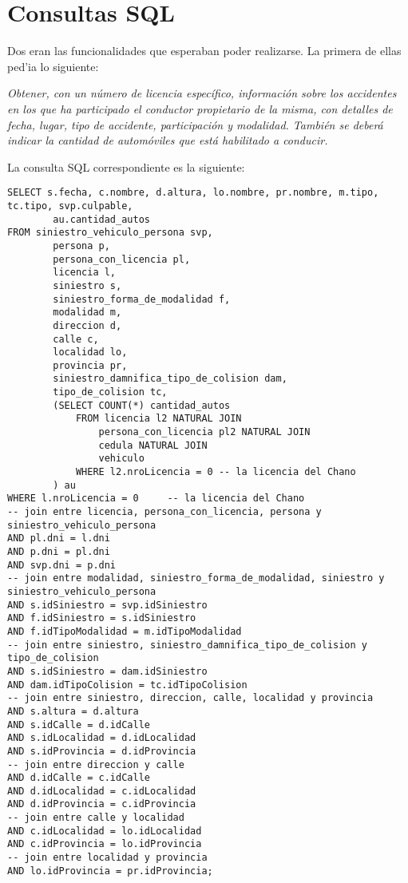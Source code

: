 \section{Consultas SQL}

Dos eran las funcionalidades que esperaban poder realizarse. La primera de ellas ped'ia lo siguiente:

\textit{Obtener, con un número de licencia específico,
información sobre los accidentes en los que ha participado el conductor propietario de
la misma, con detalles de fecha, lugar, tipo de accidente, participación y modalidad.
También se deberá indicar la cantidad de automóviles que está habilitado a conducir.}

La consulta SQL correspondiente es la siguiente:

\begin{verbatim}
SELECT s.fecha, c.nombre, d.altura, lo.nombre, pr.nombre, m.tipo, tc.tipo, svp.culpable, 
        au.cantidad_autos
FROM siniestro_vehiculo_persona svp, 
        persona p, 
        persona_con_licencia pl, 
        licencia l, 
        siniestro s,
        siniestro_forma_de_modalidad f,
        modalidad m,
        direccion d,
        calle c,
        localidad lo, 
        provincia pr,
        siniestro_damnifica_tipo_de_colision dam, 
        tipo_de_colision tc,
        (SELECT COUNT(*) cantidad_autos
            FROM licencia l2 NATURAL JOIN 
                persona_con_licencia pl2 NATURAL JOIN
                cedula NATURAL JOIN
                vehiculo
            WHERE l2.nroLicencia = 0 -- la licencia del Chano
        ) au
WHERE l.nroLicencia = 0		-- la licencia del Chano
-- join entre licencia, persona_con_licencia, persona y siniestro_vehiculo_persona
AND pl.dni = l.dni
AND p.dni = pl.dni
AND svp.dni = p.dni
-- join entre modalidad, siniestro_forma_de_modalidad, siniestro y siniestro_vehiculo_persona
AND s.idSiniestro = svp.idSiniestro
AND f.idSiniestro = s.idSiniestro
AND f.idTipoModalidad = m.idTipoModalidad
-- join entre siniestro, siniestro_damnifica_tipo_de_colision y tipo_de_colision
AND s.idSiniestro = dam.idSiniestro
AND dam.idTipoColision = tc.idTipoColision
-- join entre siniestro, direccion, calle, localidad y provincia
AND s.altura = d.altura
AND s.idCalle = d.idCalle
AND s.idLocalidad = d.idLocalidad
AND s.idProvincia = d.idProvincia
-- join entre direccion y calle
AND d.idCalle = c.idCalle
AND d.idLocalidad = c.idLocalidad
AND d.idProvincia = c.idProvincia
-- join entre calle y localidad
AND c.idLocalidad = lo.idLocalidad
AND c.idProvincia = lo.idProvincia
-- join entre localidad y provincia
AND lo.idProvincia = pr.idProvincia;
\end{verbatim}


